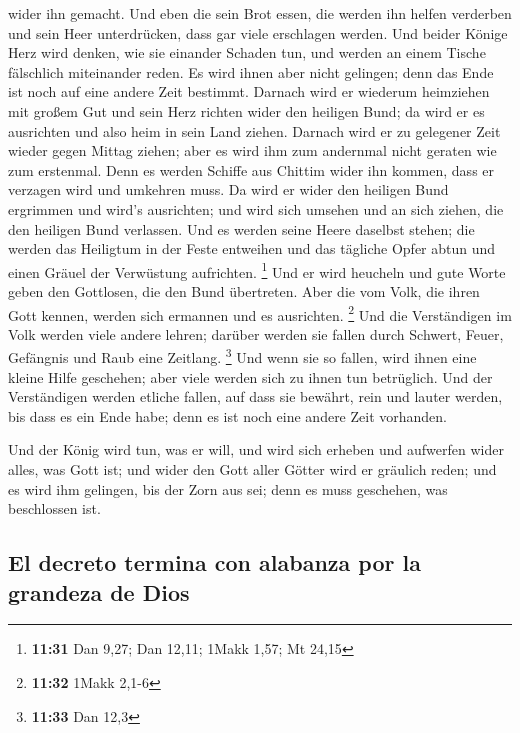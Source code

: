 wider ihn gemacht.  Und eben die sein Brot essen, die
werden ihn helfen verderben und sein Heer unterdrücken, dass gar viele
erschlagen werden.  Und beider Könige Herz wird denken,
wie sie einander Schaden tun, und werden an einem Tische fälschlich
miteinander reden. Es wird ihnen aber nicht gelingen; denn das Ende ist
noch auf eine andere Zeit bestimmt.  Darnach wird er
wiederum heimziehen mit großem Gut und sein Herz richten wider den
heiligen Bund; da wird er es ausrichten und also heim in sein Land
ziehen.  Darnach wird er zu gelegener Zeit wieder gegen
Mittag ziehen; aber es wird ihm zum andernmal nicht geraten wie zum
erstenmal.  Denn es werden Schiffe aus Chittim wider ihn
kommen, dass er verzagen wird und umkehren muss. Da wird er wider den
heiligen Bund ergrimmen und wird's ausrichten; und wird sich umsehen und
an sich ziehen, die den heiligen Bund verlassen.  Und es
werden seine Heere daselbst stehen; die werden das Heiligtum in der
Feste entweihen und das tägliche Opfer abtun und einen Gräuel der
Verwüstung aufrichten. \footnote{\textbf{11:31} Dan 9,27; Dan 12,11;
  1Makk 1,57; Mt 24,15}  Und er wird heucheln und gute
Worte geben den Gottlosen, die den Bund übertreten. Aber die vom Volk,
die ihren Gott kennen, werden sich ermannen und es ausrichten.
\footnote{\textbf{11:32} 1Makk 2,1-6}  Und die
Verständigen im Volk werden viele andere lehren; darüber werden sie
fallen durch Schwert, Feuer, Gefängnis und Raub eine Zeitlang.
\footnote{\textbf{11:33} Dan 12,3}  Und wenn sie so
fallen, wird ihnen eine kleine Hilfe geschehen; aber viele werden sich
zu ihnen tun betrüglich.  Und der Verständigen werden
etliche fallen, auf dass sie bewährt, rein und lauter werden, bis dass
es ein Ende habe; denn es ist noch eine andere Zeit vorhanden.

 Und der König wird tun, was er will, und wird sich
erheben und aufwerfen wider alles, was Gott ist; und wider den Gott
aller Götter wird er gräulich reden; und es wird ihm gelingen, bis der
Zorn aus sei; denn es muss geschehen, was beschlossen ist.

\hypertarget{el-decreto-termina-con-alabanza-por-la-grandeza-de-dios}{%
\subsection{El decreto termina con alabanza por la grandeza de
Dios}\label{el-decreto-termina-con-alabanza-por-la-grandeza-de-dios}}

